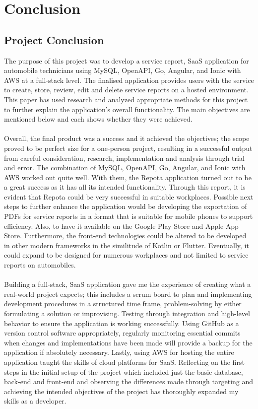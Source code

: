 \chapter{Conclusion}

\section{Project Conclusion}
The purpose of this project was to develop a service report, SaaS application for automobile technicians using MySQL, OpenAPI, Go, Angular, and Ionic with AWS at a full-stack level. The finalised application provides users with the service to create, store, review, edit and delete service reports on a hosted environment. This paper has used research and analyzed appropriate methods for this project to further explain the application's overall functionality. The main objectives are mentioned below and each shows whether they were achieved.
\\\\ Overall, the final product was a success and it achieved the objectives; the scope proved to be perfect size for a one-person project, resulting in a successful output from careful consideration, research, implementation and analysis through trial and error. The combination of MySQL, OpenAPI, Go, Angular, and Ionic with AWS worked out quite well. With them, the Repota application turned out to be a great success as it has all its intended functionality. Through this report, it is evident that Repota could be very successful in suitable workplaces. Possible next steps to further enhance the application would be developing the exportation of PDFs for service reports in a format that is suitable for mobile phones to support efficiency. Also, to have it available on the Google Play Store and Apple App Store. Furthermore, the front-end technologies could be altered to be developed in other modern frameworks in the similitude of Kotlin or Flutter. Eventually, it could expand to be designed for numerous workplaces and not limited to service reports on automobiles.
\\\\ Building a full-stack, SaaS application gave me the experience of creating what a real-world project expects; this includes a scrum board to plan and implementing development procedures in a structured time frame, problem-solving by either formulating a solution or improvising. Testing through integration and high-level behavior to ensure the application is working successfully. Using GitHub as a version control software appropriately, regularly monitoring essential commits when changes and implementations have been made will provide a backup for the application if absolutely necessary. Lastly, using AWS for hosting the entire application taught the skills of cloud platforms for SaaS. Reflecting on the first steps in the initial setup of the project which included just the basic database, back-end and front-end and observing the differences made through targeting and achieving the intended objectives of the project has thoroughly expanded my skills as a developer. 

